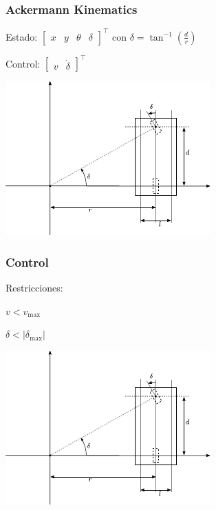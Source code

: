 \begin{frame}
    \frametitle{Ackermann Kinematics}
    
    Estado: $\begin{bmatrix} x & y & \theta & \delta \end{bmatrix}^{\top}$ con $\delta = \tan^{-1}{\left(\frac{d}{r}\right)}$
    
    Control: $\begin{bmatrix} v & \dot{\delta} \end{bmatrix}^{\top}$
    
    
    \begin{center}
        \includegraphics[width=0.6\columnwidth]{images/ackermann_kinematics.pdf}
    \end{center}
    
\end{frame}

\begin{frame}
    \frametitle{Control}
    
    Restricciones:
    
    $v < v_{\max}$
    
    $\delta < |\delta_{\max}|$
    
    
    \begin{center}
        \includegraphics[width=0.6\columnwidth]{images/ackermann_kinematics.pdf}
    \end{center}
    
\end{frame}

